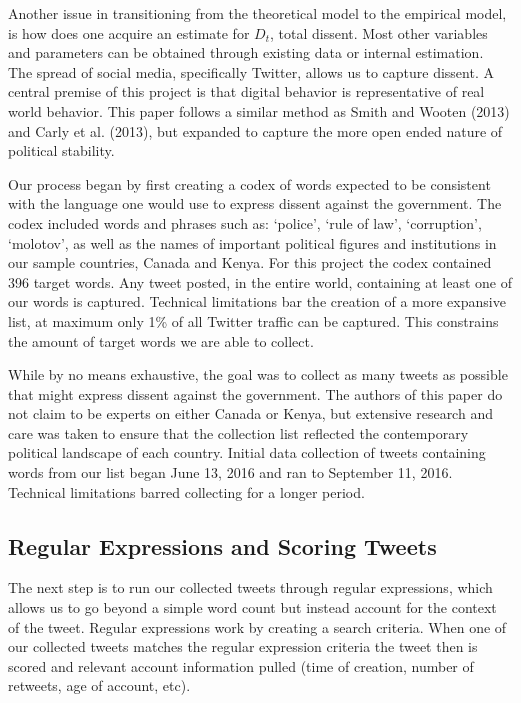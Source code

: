 \documentclass[12pt]{article}
\begin{document}
\begin{spacing}{1.5}
Another issue in transitioning from the theoretical model to the empirical model, is how does one acquire an estimate for $D_t$, total dissent. Most other variables and parameters can be obtained through existing data or internal estimation. The spread of social media, specifically Twitter, allows us to capture dissent. A central premise of this project is that digital behavior is representative of real world behavior. This paper follows a similar method as Smith and Wooten (2013) and Carly et al. (2013), but expanded to capture the more open ended nature of political stability. 

Our process began by first creating a codex of words expected to be consistent with the language one would use to express dissent against the government. The codex included words and phrases such as: `police', `rule of law', `corruption', `molotov', as well as the names of important political figures and institutions in our sample countries, Canada and Kenya. For this project the codex contained 396 target words. Any tweet posted, in the entire world, containing at least one of our words is captured. Technical limitations bar the creation of a more expansive list, at maximum only 1\% of all Twitter traffic can be captured. This constrains the amount of target words we are able to collect. 

While by no means exhaustive, the goal was to collect as many tweets as possible that might express dissent against the government. The authors of this paper do not claim to be experts on either Canada or Kenya, but extensive research and care was taken to ensure that the collection list reflected the contemporary political landscape of each country. Initial data collection of tweets containing words from our list began June 13, 2016 and ran to September 11, 2016. Technical limitations barred collecting for a longer period. 


\subsection*{Regular Expressions and Scoring Tweets}

The next step is to run our collected tweets through regular expressions, which allows us to go beyond a simple word count but instead account for the context of the tweet. Regular expressions work by creating a search criteria. When one of our collected tweets matches the regular expression criteria the tweet then is scored and relevant account information pulled (time of creation, number of retweets, age of account, etc). 


\end{spacing}
\end{document}
